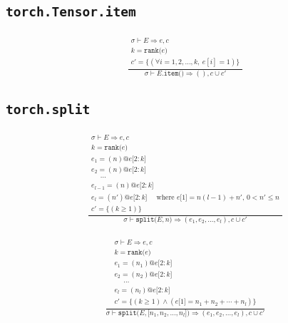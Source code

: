 \documentclass{article}
\makeatletter
\newcommand{\Rar}{\Rightarrow}
\newcommand{\mtt}[1]{\mathtt{#1}}
\newcommand{\bigspace}{\,\,\,\,\,\,\,\,}
\newcommand{\op}[2]{\mtt{#1(}#2\mtt{)}}
\newcommand{\conc}{\mtt{@}}
\newcommand{\ind}[1]{\mtt{[}#1\mtt{]}}
\newcommand{\indr}[2]{\mtt{[}#1\mtt{:}#2\mtt{]}}
\makeatother
\begin{document}
\subsection*{\texttt{torch.Tensor.item}}%
\begin{align*}
  \frac
  {
    \begin{array}{l}
      \sigma \vdash E \Rar e, c \\
      k = \op{rank}{e} \\
      c' = \{ (\forall i = 1, 2, \dots, k,\: e[i] = 1) \}
    \end{array}
  }
  {
    \sigma \vdash E.\op{item}{} \Rar (), c \cup c'
  }
\end{align*}%

\subsection*{\texttt{torch.split}}%
\begin{align*}
  \frac
  {
    \begin{array}{l}
      \sigma \vdash E \Rar e, c \\
      k = \op{rank}{e} \\
      e_1 = (n) \conc e\indr{2}{k} \\
      e_2 = (n) \conc e\indr{2}{k} \\
      \bigspace \cdots \\
      e_{l-1} = (n) \conc e\indr{2}{k} \\
      e_l = (n') \conc e\indr{2}{k}\bigspace
        \text{where $e \ind{1} = n(l-1) + n'$, $0 < n' \leq n$} \\
      c' = \{ (k \geq 1) \}
    \end{array}
  }
  {
    \sigma \vdash \op{split}{E, n} \Rar (e_1, e_2, \dots, e_l), c \cup c'
  }
  \tag*{$l$-원소 tuple 형태로 반환}
\end{align*}

\begin{align*}
  \frac
  {
    \begin{array}{l}
      \sigma \vdash E \Rar e, c \\
      k = \op{rank}{e} \\
      e_1 = (n_1) \conc e\indr{2}{k} \\
      e_2 = (n_2) \conc e\indr{2}{k} \\
      \bigspace \cdots \\
      e_l = (n_l) \conc e\indr{2}{k} \\
      c' = \{ (k \geq 1) \land (e \ind{1} = n_1 + n_2 + \cdots + n_l) \}
    \end{array}
  }
  {
    \sigma \vdash \op{split}{E, \ind{n_1, n_2, \dots, n_l}}
      \Rar (e_1, e_2, \dots, e_l), c \cup c'
  }
  \tag*{$l$-원소 tuple 형태로 반환}
\end{align*}
\end{document}
